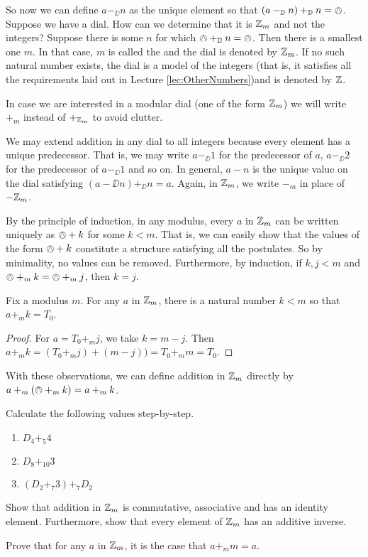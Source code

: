 So now we can define $a -_\DD n$ as the unique element so that $(a -_{\mathbb D} n) +_{\mathbb D} n = \owedge$.
Suppose we have a dial. How can we determine that it is ${\mathbb Z}_m$ and not the integers? Suppose there is some $n$ for which $\owedge +_{\mathbb D} n = \owedge$. Then there is a smallest one $m$. In that case, $m$ is called the  and the dial is denoted by ${\mathbb Z}_m$. If no such natural number exists, the dial is a model of the integers (that is, it satisfies all the requirements laid out in Lecture \ref{lec:OtherNumbers})and is denoted by ${\mathbb Z}$.

In case we are interested in a modular dial (one of the form ${\mathbb Z}_m$) we will write $+_m$ instead of $+_{{\mathbb Z}_m}$ to avoid clutter.

We may extend addition in any dial to all integers because every element has a unique predecessor. That is, we may write $a-_\DD 1$ for the predecessor of $a$, $a-_\DD 2$ for the predecessor of $a-_\DD 1$ and so on. In general, $a-n$ is the unique value on the dial satisfying $(a-\DD n) +_\DD n = a$. Again, in ${\mathbb Z}_m$, we write $-_m$ in place of $-{{\mathbb Z}_m}$. 

By the principle of induction, in any modulus, every $a$ in ${\mathbb Z}_m$ can be written uniquely as $\owedge + k$ for some $k<m$.
That is, we can easily show that the values of the form $\owedge + k$ constitute a structure satisfying all the postulates. So by minimality, no values can be removed. Furthermore, by induction, if $k,j<m$ and $\owedge +_m k = \owedge +_m j$, then $k=j$. 

\begin{lem}
	Fix a modulus $m$. 
	For any $a$ in ${\mathbb Z}_m$, there is a natural number $k<m$ so that $a +_m k = T_0$. 	
	\begin{proof}
		For $a = T_0 +_m j$, we take $k = m-j$. Then $a +_m k = (T_0 +_m j) + (m-j)) = T_0 +_m m = T_0$.
	\end{proof}
\end{lem}

With these observations, we can define addition in ${\mathbb Z}_m$ directly by $a +_m (\owedge+_m k) = a +_m k$. 

\begin{exer}
	\begin{exercise}
		\item Calculate the following values step-by-step.
		\begin{enumerate}
			\item $D_4 +_{5}4$
			\item $D_8+_{10}3$
			\item $(D_2 +_{7} 3) +_{7} D_2$
		\end{enumerate}
		\item Show that addition in ${\mathbb Z}_m$ is commutative, associative and has an identity element. Furthermore, show that every element of ${\mathbb Z}_m$ has an additive inverse.
		\item Prove that for any $a$ in ${\mathbb Z}_m$, it is the case that $a +_m m = a$.
	\end{exercise}
\end{exer}

